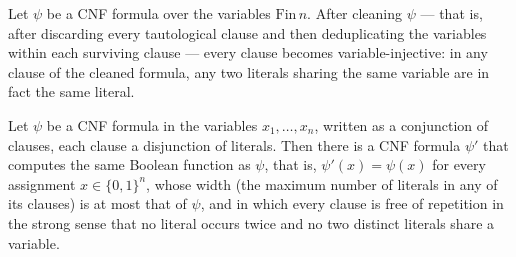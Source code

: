 \begin{lemma}
\label{LMN.cleanCNF_D3_var_inj}
\leanok
{}
Let $\psi$ be a CNF formula over the variables $\mathrm{Fin}\,n$. After cleaning $\psi$
— that is, after discarding every tautological clause and then deduplicating the
variables within each surviving clause — every clause becomes variable-injective: in any
clause of the cleaned formula, any two literals sharing the same variable are in fact
the same literal.
\end{lemma}

\begin{theorem}
\label{LMN.exists_nice_cnf_of_cnf}
\leanok
{}
Let $\psi$ be a CNF formula in the variables $x_1,\dots,x_n$, written as a conjunction
of clauses, each clause a disjunction of literals. Then there is a CNF formula $\psi'$
that computes the same Boolean function as $\psi$, that is, $\psi'(x)=\psi(x)$ for every
assignment $x\in\{0,1\}^n$, whose width (the maximum number of literals in any of its
clauses) is at most that of $\psi$, and in which every clause is free of repetition in
the strong sense that no literal occurs twice and no two distinct literals share a
variable.
\end{theorem}


